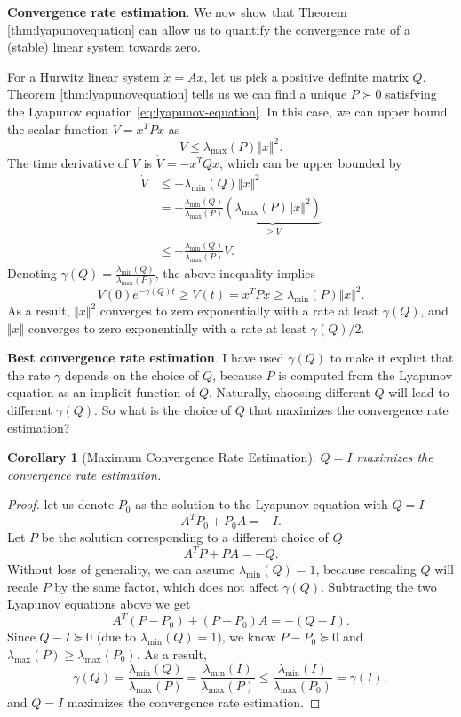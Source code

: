 \documentclass[
]{book}
\newtheorem{corollary}{Corollary}[chapter]
\theoremstyle{definition}
\theoremstyle{definition}
\theoremstyle{definition}
\theoremstyle{definition}
\theoremstyle{remark}
\begin{document}
\textbf{Convergence rate estimation}. We now show that Theorem \ref{thm:lyapunovequation} can allow us to quantify the convergence rate of a (stable) linear system towards zero.

For a Hurwitz linear system \(\dot{x} = Ax\), let us pick a positive definite matrix \(Q\). Theorem \ref{thm:lyapunovequation} tells us we can find a unique \(P \succ 0\) satisfying the Lyapunov equation \eqref{eq:lyapunov-equation}. In this case, we can upper bound the scalar function \(V = x^T P x\) as
\[
V \leq \lambda_{\max}(P) \Vert x \Vert^2.
\]
The time derivative of \(V\) is \(\dot{V} = - x^T Q x\), which can be upper bounded by
\begin{align}
\dot{V} & \leq - \lambda_{\min} (Q) \Vert x \Vert^2 \\
& = - \frac{\lambda_{\min} (Q)}{\lambda_{\max} (P)} \underbrace{ \left( \lambda_{\max} (P) \Vert x \Vert^2 \right)}_{\geq V} \\
& \leq - \frac{\lambda_{\min} (Q)}{\lambda_{\max} (P)} V.
\end{align}
Denoting \(\gamma(Q) = \frac{\lambda_{\min} (Q)}{\lambda_{\max}(P)}\), the above inequality implies
\[
V(0) e^{-\gamma(Q) t} \geq V(t) = x^T P x \geq \lambda_{\min}(P) \Vert x \Vert^2.
\]
As a result, \(\Vert x \Vert^2\) converges to zero exponentially with a rate at least \(\gamma(Q)\), and \(\Vert x \Vert\) converges to zero exponentially with a rate at least \(\gamma(Q) / 2\).

\textbf{Best convergence rate estimation}. I have used \(\gamma (Q)\) to make it explict that the rate \(\gamma\) depends on the choice of \(Q\), because \(P\) is computed from the Lyapunov equation as an implicit function of \(Q\). Naturally, choosing different \(Q\) will lead to different \(\gamma (Q)\). So what is the choice of \(Q\) that maximizes the convergence rate estimation?

\begin{corollary}[Maximum Convergence Rate Estimation]
\protect\hypertarget{cor:bestconvergencerate}{}\label{cor:bestconvergencerate}\(Q = I\) maximizes the convergence rate estimation.
\end{corollary}

\begin{proof}
let us denote \(P_0\) as the solution to the Lyapunov equation with \(Q = I\)
\[
A^T P_0 + P_0 A = - I.
\]
Let \(P\) be the solution corresponding to a different choice of \(Q\)
\[
A^T P + P A = - Q.
\]
Without loss of generality, we can assume \(\lambda_{\min}(Q) = 1\), because rescaling \(Q\) will recale \(P\) by the same factor, which does not affect \(\gamma(Q)\). Subtracting the two Lyapunov equations above we get
\[
A^T (P - P_0) + (P - P_0) A = - (Q - I).
\]
Since \(Q - I \succeq 0\) (due to \(\lambda_{\min}(Q) = 1\)), we know \(P - P_0 \succeq 0\) and \(\lambda_{\max} (P) \geq \lambda_{\max} (P_0)\). As a result,
\[
\gamma(Q) = \frac{\lambda_{\min}(Q)}{\lambda_{\max}(P)} =  \frac{\lambda_{\min}(I)}{\lambda_{\max}(P)} \leq \frac{\lambda_{\min}(I)}{\lambda_{\max}(P_0)} = \gamma(I),
\]
and \(Q = I\) maximizes the convergence rate estimation.
\end{proof}
\end{document}
